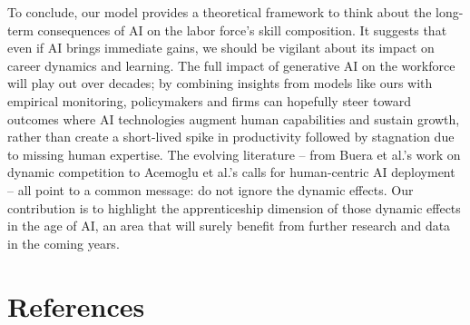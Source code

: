 \documentclass[12pt]{article}
\begin{document}
{To conclude, our model provides a theoretical framework to think about
the {long-term consequences of AI on the labor force's skill
composition}. It suggests that even if AI brings immediate gains, we
should be vigilant about its impact on {career dynamics and
learning}. The full impact of generative AI on the workforce will play
out over decades; by combining insights from models like ours with
empirical monitoring, policymakers and firms can hopefully steer toward
outcomes where AI technologies {augment} human capabilities and
sustain growth, rather than create a short-lived spike in productivity
followed by stagnation due to missing human expertise. The evolving
literature -- from Buera et al.'s work on dynamic competition to
Acemoglu et al.'s calls for human-centric AI deployment -- all point to
a common message: {do not ignore the dynamic effects}. Our
contribution is to highlight the apprenticeship dimension of those
dynamic effects in the age of AI, an area that will surely benefit from
further research and data in the coming years.


\section*{References}\label{references}
\begin{itemize}


\end{itemize}}
\end{document}
